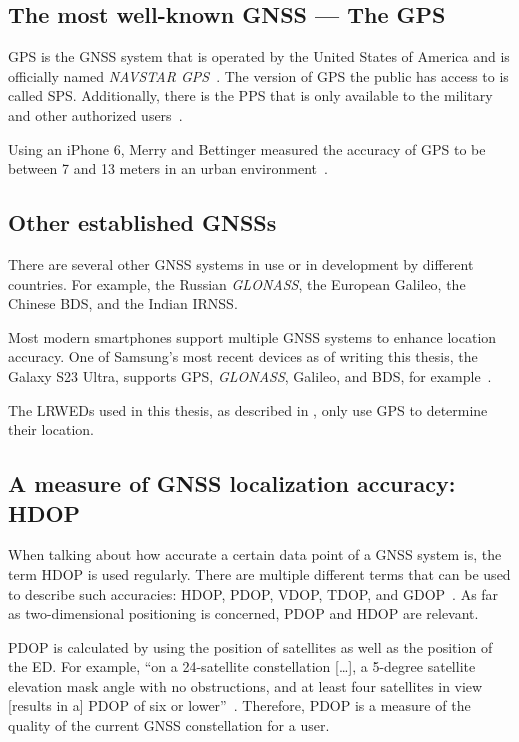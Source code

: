 \subsection{The most well-known \acl{GNSS} — The \acl{GPS}}

\ac{GPS} is the \ac{GNSS} system that is operated by the United States of America and is officially named \emph{NAVSTAR \ac{GPS}}~\cite{department_of_defense_usa_gps_2020}.
The version of \ac{GPS} the public has access to is called \acf{SPS}.
Additionally, there is the \acf{PPS} that is only available to the military and other authorized users~\cite{department_of_defense_usa_gps_2007}.

Using an iPhone 6, Merry and Bettinger measured the accuracy of \ac{GPS} to be between 7 and 13 meters in an urban environment~\cite{merry_smartphone_2019}.

\subsection{Other established \aclp{GNSS}}

There are several other \ac{GNSS} systems in use or in development by different countries.
For example, the Russian \emph{GLONASS}, the European Galileo, the Chinese \acf{BDS}, and the Indian \acf{IRNSS}.

Most modern smartphones support multiple \ac{GNSS} systems to enhance location accuracy.
One of Samsung's most recent devices as of writing this thesis, the Galaxy S23 Ultra, supports \ac{GPS}, \emph{GLONASS}, Galileo, and \ac{BDS}, for example~\cite{gsmarena_samsung_2023}.

The \aclp{LRWED} used in this thesis, as described in , only use \ac{GPS} to determine their location.

\subsection{A measure of \acl{GNSS} localization accuracy: \acl{HDOP}}

When talking about how accurate a certain data point of a \ac{GNSS} system is, the term \ac{HDOP} is used regularly.
There are multiple different terms that can be used to describe such accuracies: \ac{HDOP}, \ac{PDOP}, \ac{VDOP}, \ac{TDOP}, and \ac{GDOP}~\cite{langley_dilution_1999}.
As far as two-dimensional positioning is concerned, \ac{PDOP} and \ac{HDOP} are relevant.

\ac{PDOP} is calculated by using the position of satellites as well as the position of the \acl{ED}.
For example, ``on a 24-satellite constellation […], a 5-degree satellite elevation mask angle with no obstructions, and at least four satellites in view [results in a] \acf{PDOP} of six or lower''~\cite{langley_dilution_1999}.
Therefore, \ac{PDOP} is a measure of the quality of the current \ac{GNSS} constellation for a user.

